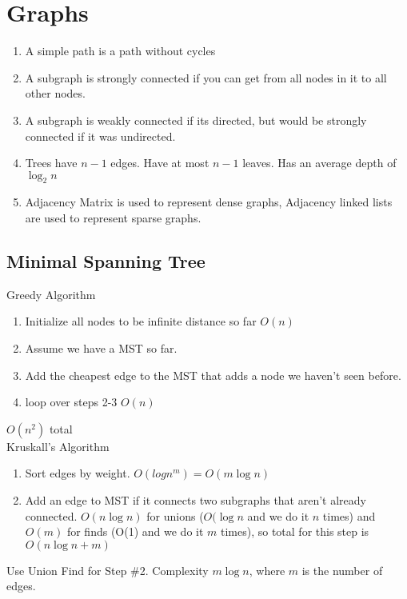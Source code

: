 \documentclass[12pt,twocolumn]{article}
\begin{document}
\section{Graphs}
\begin{enumerate}
    \item A simple path is a path without cycles
    \item A subgraph is strongly connected if you can get from all nodes in it to all other nodes.
    \item A subgraph is weakly connected if its directed, but would be strongly connected if it was undirected.
    \item Trees have $n-1$ edges. Have at most $n-1$ leaves. Has an average depth of $\log_2 n$
    \item Adjacency Matrix is used to represent dense graphs, Adjacency linked lists are used to represent sparse graphs.
\end{enumerate}



\subsection{Minimal Spanning Tree}
Greedy Algorithm
\begin{enumerate}
    \item Initialize all nodes to be infinite distance so far $O(n)$
    \item Assume we have a MST so far.
    \item Add the cheapest edge to the MST that adds a node we haven't seen before.
    \item loop over steps 2-3 $O(n)$
\end{enumerate}
$O(n^2)$ total\\


Kruskall's Algorithm
\begin{enumerate}
    \item Sort edges by weight. $O(logn^m) = O(m\log{n})$
    \item Add an edge to MST if it connects two subgraphs that aren't already connected. $O(n\log{n})$ for
        unions ($O(\log{n}$ and we do it $n$ times) and $O(m)$ for finds (O(1) and we do it $m$ times), so total for this step is $O(n\log{n}+m)$
\end{enumerate}

Use Union Find for Step \#2. Complexity $m \log n$, where $m$ is the number of edges.
\end{document}
